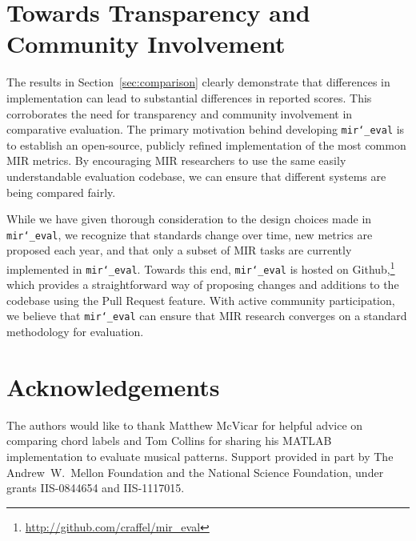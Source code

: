 \documentclass{article}
\def\mireval{\texttt{mir\char`_eval}}
\begin{document}
\section{Towards Transparency and Community Involvement}
\label{sec:discussion}

The results in Section~\ref{sec:comparison} clearly demonstrate that differences in implementation can lead to substantial differences in reported scores.
This corroborates the need for transparency and community involvement in comparative evaluation.
The primary motivation behind developing \mireval{} is to establish an open-source, publicly refined implementation of the most common MIR metrics.
By encouraging MIR researchers to use the same easily understandable evaluation codebase, we can ensure that different systems are being compared fairly.

While we have given thorough consideration to the design choices made in \mireval{}, we recognize that standards change over time, new metrics are proposed each year, and that only a subset of MIR tasks are currently implemented in \mireval{}.
Towards this end, \mireval{} is hosted on Github,\footnote{\url{http://github.com/craffel/mir_eval}} which provides a straightforward way of proposing changes and additions to the codebase using the Pull Request feature.
With active community participation, we believe that \mireval{} can ensure that MIR research converges on a standard methodology for evaluation.

\section{Acknowledgements}

The authors would like to thank Matthew McVicar for helpful advice on comparing chord labels and Tom Collins
for sharing his MATLAB implementation to evaluate musical patterns. 
Support provided in part by The Andrew~W.~Mellon Foundation and the National Science Foundation, under grants IIS-0844654 and IIS-1117015.


\end{document}
